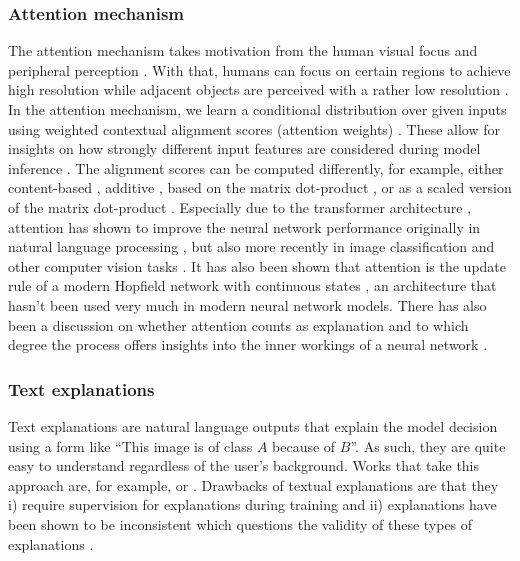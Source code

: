 \subsubsection{Attention mechanism}
The attention mechanism \citep{VaswaniSPUJGKP17} takes motivation from the human visual focus and peripheral perception \citep{schmidt2019recurrent}. With that, humans can focus on certain regions to achieve high resolution while adjacent objects are perceived with a rather low resolution \citep{schmidt2019recurrent}. In the attention mechanism, we learn a conditional distribution over given inputs using weighted contextual alignment scores (attention weights) \citep{xie2020explainable}. These allow for insights on how strongly different input features are considered during model inference \citep{xie2020explainable}. The alignment scores can be computed differently, for example, either content-based \citep{graves2014neural}, additive \citep{BahdanauCB14}, based on the matrix dot-product \citep{LuongPM15}, or as a scaled version of the matrix dot-product \citep{VaswaniSPUJGKP17}. Especially due to the transformer architecture \citep{VaswaniSPUJGKP17}, attention has shown to improve the neural network performance originally in natural language processing \citep{DevlinCLT19, brown2020language, lan2019albert}, but also more recently in image classification and other computer vision tasks \citep{AnwarB19, ZamirAKHK0020}. It has also been shown that attention is the update rule of a modern Hopfield network with continuous states \citep{ramsauer2020hopfield}, an architecture that hasn't been used very much in modern neural network models. There has also been a discussion on whether attention counts as explanation and to which degree the process offers insights into the inner workings of a neural network \citep{JainW19, WiegreffeP19, SenHYKR20}.

\subsubsection{Text explanations}
Text explanations are natural language outputs that explain the model decision using a form like ``This image is of class $A$ because of $B$''. As such, they are quite easy to understand regardless of the user's background. Works that take this approach are, for example, \citet{HendricksARDSD16} or \citet{ParkHARSDR18}. Drawbacks of textual explanations are that they i) require supervision for explanations during training and ii) explanations have been shown to be inconsistent which questions the validity of these types of explanations \citep{CamburuSMLB20}. 

